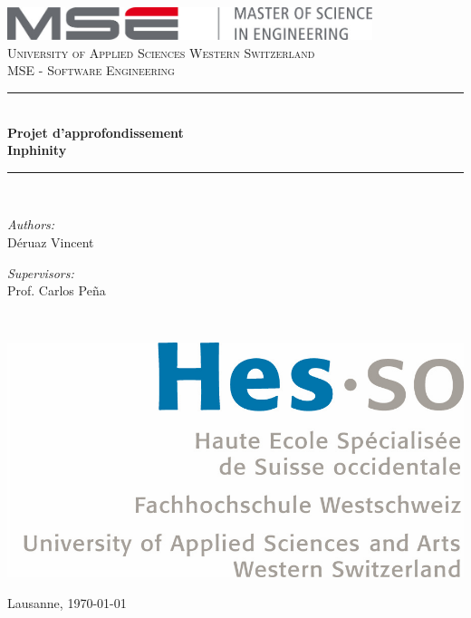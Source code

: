 \documentclass[a4paper,11pt]{report}
\newcommand{\School}{University of Applied Sciences Western Switzerland}
\newcommand{\Faculty}{MSE - Software Engineering}
\newcommand{\Place}{Lausanne}
\newcommand{\Supervisors}{Prof. Carlos Peña}
\newcommand{\Authors}{Déruaz Vincent}
\newcommand{\Course}{Projet d'approfondissement \\ Inphinity}
\newcommand{\HRule}{\rule{\linewidth}{0.5mm}}
\begin{document}
\begin{titlepage}
    \begin{center}

        \includegraphics[width=0.8\textwidth]{img/mse_logo}~\\[1.5cm]
        \textsc{\Large \School}\\[0.25cm]
        \textsc{\Large \Faculty}\\[1.5cm]

        \HRule \\[0.4cm]
        { \huge \bfseries \Course \\[0.4cm] }
        \HRule \\[1.5cm]

        \begin{minipage}[t]{0.4\textwidth}
            \begin{flushleft} \Large
                \emph{Authors:}\\ \Authors
            \end{flushleft}
        \end{minipage}
        \begin{minipage}[t]{0.4\textwidth}
            \begin{flushright} \Large
                \emph{Supervisors:}\\\Supervisors
            \end{flushright}
        \end{minipage}~\\[1.5cm]

        \begin{center}
            \includegraphics[scale=0.7]{img/logo_hes-so}
        \end{center}

        \vfill

        {\large \Place, \today}

    \end{center}
\end{titlepage}
\end{document}
